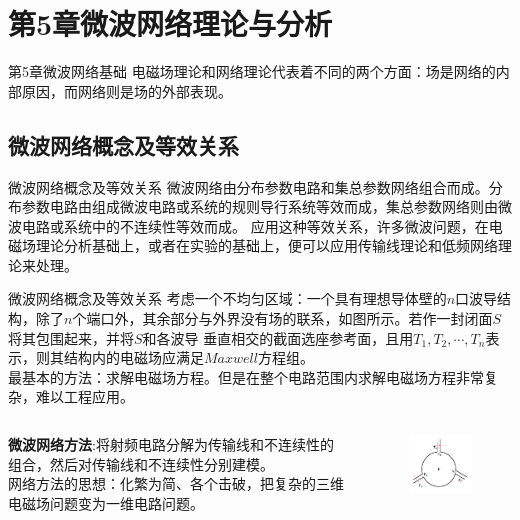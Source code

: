 \section{第5章\quad 微波网络理论与分析}
\begin{frame}{第5章\quad 微波网络基础}
    电磁场理论和网络理论代表着不同的两个方面：场是网络的内部原因，而网络则是场的外部表现。
\end{frame}

\subsection{微波网络概念及等效关系}
\begin{frame}{微波网络概念及等效关系}
    微波网络由分布参数电路和集总参数网络组合而成。分布参数电路由组成微波电路或系统的规则导行系统等效而成，集总参数网络则由微波电路或系统中的不连续性等效而成。
    应用这种等效关系，许多微波问题，在电磁场理论分析基础上，或者在实验的基础上，便可以应用传输线理论和低频网络理论来处理。
\end{frame}
\begin{frame}{微波网络概念及等效关系}
    考虑一个不均匀区域：一个具有理想导体壁的$n$口波导结构，除了$n$个端口外，其余部分与外界没有场的联系，如图所示。若作一封闭面$S$将其包围起来，并将$S$和各波导
    垂直相交的截面选座参考面，且用$T_1,T_2,\cdots,T_n$表示，则其结构内的电磁场应满足$Maxwell$方程组。\\
    最基本的方法：求解电磁场方程。但是在整个电路范围内求解电磁场方程非常复杂，难以工程应用。
    \begin{columns}
        \begin{column}{0.6\linewidth}
            \textbf{微波网络方法}:将射频电路分解为传输线和不连续性的组合，然后对传输线和不连续性分别建模。\\
            网络方法的思想：化繁为简、各个击破，把复杂的三维电磁场问题变为一维电路问题。
        \end{column}
        \begin{column}{0.4\linewidth}
            \begin{figure}
                \includegraphics[width=4.5cm]{Cha5//fig5-1.pdf}
            \end{figure}
        \end{column}
    \end{columns}
\end{frame}

